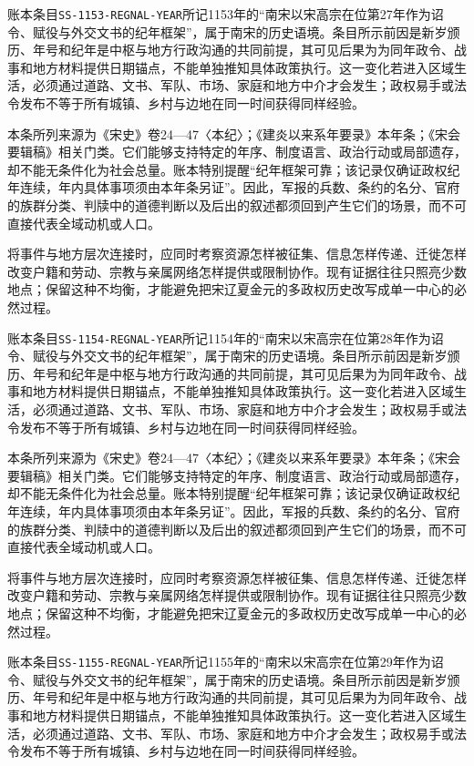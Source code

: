 账本条目\texttt{SS-1153-REGNAL-YEAR}所记1153年的“南宋以宋高宗在位第27年作为诏令、赋役与外交文书的纪年框架”，属于南宋的历史语境。条目所示前因是新岁颁历、年号和纪年是中枢与地方行政沟通的共同前提，其可见后果为为同年政令、战事和地方材料提供日期锚点，不能单独推知具体政策执行。这一变化若进入区域生活，必须通过道路、文书、军队、市场、家庭和地方中介才会发生；政权易手或法令发布不等于所有城镇、乡村与边地在同一时间获得同样经验。

本条所列来源为《宋史》卷24—47〈本纪〉；《建炎以来系年要录》本年条；《宋会要辑稿》相关门类。它们能够支持特定的年序、制度语言、政治行动或局部遗存，却不能无条件化为社会总量。账本特别提醒“纪年框架可靠；该记录仅确证政权纪年连续，年内具体事项须由本年条另证”。因此，军报的兵数、条约的名分、官府的族群分类、判牍中的道德判断以及后出的叙述都须回到产生它们的场景，而不可直接代表全域动机或人口。

将事件与地方层次连接时，应同时考察资源怎样被征集、信息怎样传递、迁徙怎样改变户籍和劳动、宗教与亲属网络怎样提供或限制协作。现有证据往往只照亮少数地点；保留这种不均衡，才能避免把宋辽夏金元的多政权历史改写成单一中心的必然过程。

账本条目\texttt{SS-1154-REGNAL-YEAR}所记1154年的“南宋以宋高宗在位第28年作为诏令、赋役与外交文书的纪年框架”，属于南宋的历史语境。条目所示前因是新岁颁历、年号和纪年是中枢与地方行政沟通的共同前提，其可见后果为为同年政令、战事和地方材料提供日期锚点，不能单独推知具体政策执行。这一变化若进入区域生活，必须通过道路、文书、军队、市场、家庭和地方中介才会发生；政权易手或法令发布不等于所有城镇、乡村与边地在同一时间获得同样经验。

本条所列来源为《宋史》卷24—47〈本纪〉；《建炎以来系年要录》本年条；《宋会要辑稿》相关门类。它们能够支持特定的年序、制度语言、政治行动或局部遗存，却不能无条件化为社会总量。账本特别提醒“纪年框架可靠；该记录仅确证政权纪年连续，年内具体事项须由本年条另证”。因此，军报的兵数、条约的名分、官府的族群分类、判牍中的道德判断以及后出的叙述都须回到产生它们的场景，而不可直接代表全域动机或人口。

将事件与地方层次连接时，应同时考察资源怎样被征集、信息怎样传递、迁徙怎样改变户籍和劳动、宗教与亲属网络怎样提供或限制协作。现有证据往往只照亮少数地点；保留这种不均衡，才能避免把宋辽夏金元的多政权历史改写成单一中心的必然过程。

账本条目\texttt{SS-1155-REGNAL-YEAR}所记1155年的“南宋以宋高宗在位第29年作为诏令、赋役与外交文书的纪年框架”，属于南宋的历史语境。条目所示前因是新岁颁历、年号和纪年是中枢与地方行政沟通的共同前提，其可见后果为为同年政令、战事和地方材料提供日期锚点，不能单独推知具体政策执行。这一变化若进入区域生活，必须通过道路、文书、军队、市场、家庭和地方中介才会发生；政权易手或法令发布不等于所有城镇、乡村与边地在同一时间获得同样经验。


